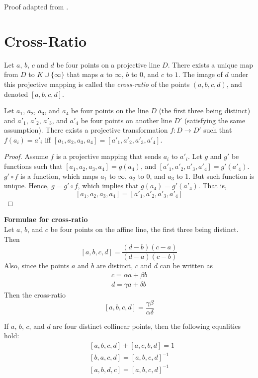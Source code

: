 Proof adapted from \cite{brannan}.

\section{Cross-Ratio}

\begin{definition}
  Let $a$, $b$, $c$ and $d$ be four points on a projective line $D$. There exists a unique map
  from $D$ to $K\cup\{\infty\}$ that maps $a$ to $\infty$, $b$ to $0$, and $c$ to $1$. The
  image of $d$ under this projective mapping is called the \textit{cross-ratio} of the points
  $(a,b,c,d)$, and denoted $[a,b,c,d]$.
\end{definition}

\begin{prop}
  Let $a_1$, $a_2$, $a_3$, and $a_4$ be four points on the line $D$ (the first three being
  distinct) and $a'_1$, $a'_2$, $a'_3$, and $a'_4$ be four points on another line $D'$
  (satisfying the same assumption). There exists a projective transformation $f\colon D \to D'$
  such that $f(a_i)=a'_i$ iff $[a_1,a_2,a_3,a_4]=[a'_1,a'_2,a'_3,a'_4]$.
\end{prop}

\begin{proof}
  Assume $f$ is a projective mapping that sends $a_i$ to $a'_i$. Let $g$ and $g'$ be functions
  such that $[a_1,a_2,a_3,a_4]=g(a_4)$, and $[a'_1,a'_2,a'_3,a'_4]=g'(a'_4)$. $g'\circ f$ is a
  function, which maps $a_1$ to $\infty$, $a_2$ to $0$, and $a_3$ to $1$. But such function is
  unique. Hence, $g=g'\circ f$, which implies that $g(a_4)=g'(a'_4)$. That is,
  \[
    [a_1,a_2,a_3,a_4]=[a'_1,a'_2,a'_3,a'_4]
  \]
\end{proof}

\begin{remark} \textbf{Formulae for cross-ratio}\\
  Let $a$, $b$, and $c$ be four points on the affine line, the first three being distinct. Then
  \[
    [a,b,c,d]=\frac{(d-b)(c-a)}{(d-a)(c-b)}
  \]
  Also, since the points $a$ and $b$ are distinct, $c$ and $d$ can be written as
  \begin{align*}
    c=\alpha a+\beta b \\
    d=\gamma a+\delta b
  \end{align*}
  Then the cross-ratio
  \[
    [a,b,c,d]=\frac{\gamma\beta}{\alpha\delta}
  \]
\end{remark}

\begin{prop}
  If $a$, $b$, $c$, and $d$ are four distinct collinear points, then the following equalities
  hold:
  \begin{align*}
    &\left[a,b,c,d\right]+\left[a,c,b,d\right]=1 \\
    &\left[b,a,c,d\right]=\left[a,b,c,d\right]^{-1} \\
    &\left[a,b,d,c\right]=\left[a,b,c,d\right]^{-1}
  \end{align*}
\end{prop}

